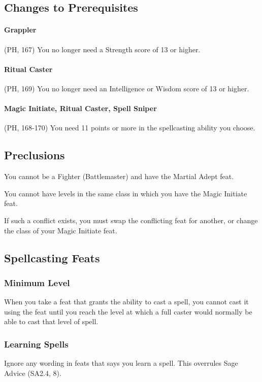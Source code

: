 \documentclass[letterpaper,twocolumn,openany,nodeprecatedcode]{dndbook}
\begin{document}
\subsection{Changes to Prerequisites}

\paragraph{Grappler} (PH, 167) You no longer need a Strength score of 13 or higher.

\paragraph{Ritual Caster} (PH, 169) You no longer need an Intelligence or Wisdom score of 13 or higher.

\paragraph{Magic Initiate, Ritual Caster, Spell Sniper} (PH, 168-170) You need 11 points or more in the spellcasting ability you choose.

\subsection{Preclusions}
You cannot be a Fighter (Battlemaster) and have the Martial Adept feat.

You cannot have levels in the same class in which you have the Magic Initiate feat.

If such a conflict exists, you must swap the conflicting feat for another, or change the class of your Magic Initiate feat.

\subsection{Spellcasting Feats}

\subsubsection{Minimum Level}
When you take a feat that grants the ability to cast a spell, you cannot cast it using the feat until you reach the level at which a full caster would normally be able to cast that level of spell.

\subsubsection{Learning Spells}
Ignore any wording in feats that says you learn a spell. This overrules Sage Advice (SA2.4, 8).
\end{document}
